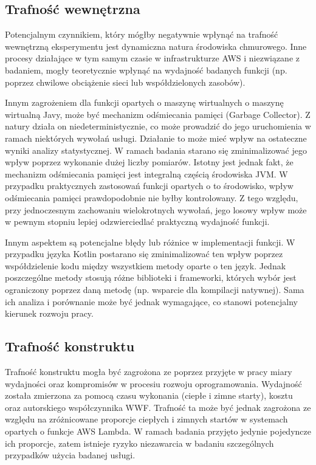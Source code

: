 \subsection*{Trafność wewnętrzna}

Potencjalnym czynnikiem, który mógłby negatywnie wpłynąć na trafność wewnętrzną eksperymentu jest dynamiczna natura środowiska chmurowego.
Inne procesy działające w tym samym czasie w infrastrukturze AWS i niezwiązane z badaniem, mogły teoretycznie wpłynąć na wydajność badanych funkcji (np. poprzez chwilowe obciążenie sieci lub współdzielonych zasobów).

Innym zagrożeniem dla funkcji opartych o maszynę wirtualnych o maszynę wirtualną Javy, może być mechanizm odśmiecania pamięci (Garbage Collector).
Z natury działa on niedeterministycznie, co może prowadzić do jego uruchomienia w ramach niektórych wywołań usługi.
Działanie to może mieć wpływ na ostateczne wyniki analizy statystycznej.
W ramach badania starano się zminimalizować jego wpływ poprzez wykonanie dużej liczby pomiarów.
Istotny jest jednak fakt, że mechanizm odśmiecania pamięci jest integralną częścią środowiska JVM.
W przypadku praktycznych zastosowań funkcji opartych o to środowisko, wpływ odśmiecania pamięci prawdopodobnie nie byłby kontrolowany.
Z tego względu, przy jednoczesnym zachowaniu wielokrotnych wywołań, jego losowy wpływ może w pewnym stopniu lepiej odzwierciedlać praktyczną wydajność funkcji.

Innym aspektem są potencjalne błędy lub różnice w implementacji funkcji.
W przypadku języka Kotlin postarano się zminimalizować ten wpływ poprzez współdzielenie kodu między wszystkiem metody oparte o ten język.
Jednak poszczególne metody stosują różne biblioteki i frameworki, których wybór jest ograniczony poprzez daną metodę (np. wsparcie dla kompilacji natywnej).
Sama ich analiza i porównanie może być jednak wymagające, co stanowi potencjalny kierunek rozwoju pracy.

\subsection*{Trafność konstruktu}

Trafność konstruktu mogła być zagrożona ze poprzez przyjęte w pracy miary wydajności oraz kompromisów w procesiu rozwoju oprogramowania.
Wydajność została zmierzona za pomocą czasu wykonania (ciepłe i zimne starty), kosztu oraz autorskiego współczynnika WWF.
Trafność ta może być jednak zagrożona ze względu na zróżnicowane proporcje ciepłych i zimnych startów w systemach opartych o funkcje AWS Lambda.
W ramach badania przyjęto jedynie pojedyncze ich proporcje, zatem istnieje ryzyko niezawarcia w badaniu szczególnych przypadków użycia badanej usługi.

